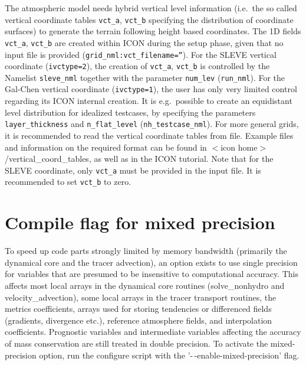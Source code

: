The atmospheric model needs hybrid vertical level information (i.e.\ the so called vertical coordinate tables \texttt{vct\_a},
\texttt{vct\_b} specifying the distribution of coordinate surfaces) to generate the terrain following height based coordinates. The 1D fields \texttt{vct\_a}, \texttt{vct\_b} are created within ICON
during the setup phase, given that no input file is provided (\texttt{grid\_nml:}\texttt{vct\_filename=''}).
For the SLEVE vertical coordinate (\texttt{ivctype=2}), the creation  of \texttt{vct\_a}, \texttt{vct\_b} is controlled by the
Namelist \texttt{sleve\_nml} together with the parameter \texttt{num\_lev} (\texttt{run\_nml}).
For the Gal-Chen vertical coordinate (\texttt{ivctype=1}), the user has only very limited control regarding its ICON internal creation.
It is e.g.\ possible to create an equidistant level distribution for idealized testcases, by specifying the parameters \texttt{layer\_thickness}
and \texttt{n\_flat\_level} (\texttt{nh\_testcase\_nml}). For more general grids, it is recommended to read the vertical coordinate tables from file.
Example files and information on the required format can be found in $<$icon home$>$/vertical\_coord\_tables, as well as in the ICON tutorial.
Note that for the SLEVE coordinate, only \texttt{vct\_a} must be provided in the input file. It is recommended to set \texttt{vct\_b} to zero.


\section{Compile flag for mixed precision}

To speed up code parts strongly limited by memory bandwidth (primarily the dynamical core and the tracer advection),
an option exists to use single precision for variables that are presumed to be insensitive to computational accuracy.
This affects most local arrays in the dynamical core routines (solve\_nonhydro and velocity\_advection), some local
arrays in the tracer transport routines, the metrics coefficients,
arrays used for storing tendencies or differenced fields (gradients, divergence etc.), reference atmosphere fields,
and interpolation coefficients. Prognostic variables and intermediate variables affecting the accuracy of mass conservation
are still treated in double precision. To activate the mixed-precision option, run the configure script with the
'-\,-enable-mixed-precision' flag.
